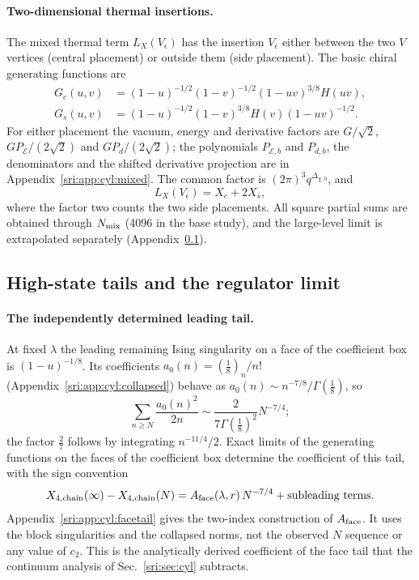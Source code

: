 \paragraph{Two-dimensional thermal insertions.} The mixed thermal term $L_X(V_\epsilon)$ has the insertion $V_\epsilon$
either between the two $V$ vertices (central placement) or outside them (side placement). The basic chiral generating
functions are
\begin{equation}
\begin{aligned}
 G_c(u,v)&=(1-u)^{-1/2}(1-v)^{-1/2}(1-uv)^{3/8}H(uv),\\
 G_s(u,v)&=(1-u)^{-1/2}(1-v)^{3/8}H(v)(1-uv)^{-1/2}.
\end{aligned}
\end{equation}
For either placement the vacuum, energy and derivative factors are $G/\sqrt2$, $GP_{\mathcal E}/(2\sqrt2)$ and
$GP_d/(2\sqrt2)$; the polynomials $P_{\mathcal E,b}$ and $P_{d,b}$, the denominators and the shifted derivative projection are in
Appendix~\ref{sri:app:cyl:mixed}. The common factor is $(2\pi)^3q^{\Delta_{\chi,0}}$, and
\begin{equation}
 L_X(V_\epsilon)=X_c+2X_s,
\end{equation}
where the factor two counts the two side placements. All square partial sums are obtained through $N_{\rm mix}$ (4096
in the base study), and the large-level limit is extrapolated separately (Appendix~\ref{sri:app:cyl:tails}).

\subsection{High-state tails and the regulator limit}\label{sri:app:cyl:tails}
\paragraph{The independently determined leading tail.} At fixed $\lambda$ the leading remaining Ising singularity on a
face of the coefficient box is $(1-u)^{-1/8}$. Its coefficients $a_0(n)=(\frac18)_n/n!$ (Appendix~\ref{sri:app:cyl:collapsed})
behave as $a_0(n)\sim n^{-7/8}/\Gamma(\frac18)$, so
\begin{equation}
 \sum_{n\ge N}\frac{a_0(n)^2}{2n}\sim\frac{2}{7\Gamma(\frac18)^2}N^{-7/4};
 \label{sri:eq:cyl:tailpower}
\end{equation}
the factor $\frac27$ follows by integrating $n^{-11/4}/2$. Exact limits of the generating functions on the faces of the
coefficient box determine the coefficient of this tail, with the sign convention
\begin{equation}
 X_{4,\rm chain}(\infty)-X_{4,\rm chain}(N)=A_{\rm face}(\lambda,r)\,N^{-7/4}+\text{subleading terms}.
\end{equation}
Appendix~\ref{sri:app:cyl:facetail} gives the two-index construction of $A_{\rm face}$. It uses the block singularities and the
collapsed norms, not the observed $N$ sequence or any value of $c_2$. This is the analytically derived coefficient of
the face tail that the continuum analysis of Sec.~\ref{sri:sec:cyl} subtracts.

